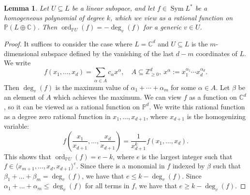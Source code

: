 \documentclass{amsart}
\newtheorem{lemma}[theorem]{Lemma}
\newcommand{\Sym}{\operatorname{Sym}}
\newcommand{\C}{\mathbb{C}}
\renewcommand{\P}{\mathbb{P}}
\newcommand{\Z}{\mathbb{Z}}
\newcommand{\ord}{\operatorname{ord}}
\theoremstyle{definition}
\begin{document}
\begin{lemma}\label{pole-degree}
    Let $U \subseteq L$ be a linear subspace, and let $f \in 
    \Sym L^*$ be a homogeneous polynomial of degree $k$, which we view as a rational function on $\P(L \oplus \C)$. Then $\ord_{\P 
    U }(f) = -\deg_v(f)$ for a generic $v \in U$.
\end{lemma}
\begin{proof}
    It suffices to consider the case where $L = \C^d$ and $U \subseteq 
    L$ is the $m$-dimensional subspace defined by the vanishing of the 
    last $d-m$ coordinates of $L$. We write
    \[
        f(x_1, \ldots, x_d) = \sum_{\alpha \in A} c_\alpha x^\alpha,\quad 
        A \subseteq \Z_{\geq 0}^d,\ x^{\alpha} := x_1^{\alpha_1} \cdots 
        x_d^{\alpha_d}. 
    \]
    Then $\deg_v(f)$ is the maximum value of $\alpha_1 + \dotsb + \alpha_m$ for some $\alpha \in A$. Let $\beta$ be an element of $A$ which achieves the maximum. We can view $f$ as a function on $\mathbb{C}^d$, so it can be viewed as a rational function on $\mathbb{P}^d$.  We write this rational function 
        as a degree zero rational function in $x_1, \ldots, x_{d+1}$,
    where $x_{d+1}$ is the homogenizing variable:
    \[
        f(\frac{x_1}{x_{d+1}}, \ldots, \frac{x_d}{x_{d+1}}) = 
        \frac{1}{x_{d+1}^k} f(x_1, \ldots, x_d).
    \]
This shows that $\ord_{\P U}(f) = e - k$, where $e$ is the largest 
    integer such that $f \in \langle x_{m+1}, \ldots, x_d, x_{d+1} \rangle^e$. Since there is a monomial in 
    $f$ indexed by $\beta$ such that $\beta_1 + \ldots + \beta_m = 
    \deg_v(f)$, we have 
    that $e \leq k - \deg_v(f)$. Since $\alpha_1 + \ldots + \alpha_m 
    \leq \deg_v(f)$ for all terms in $f$, we have that $e \geq k - 
    \deg_v(f)$.
\end{proof}
\end{document}
